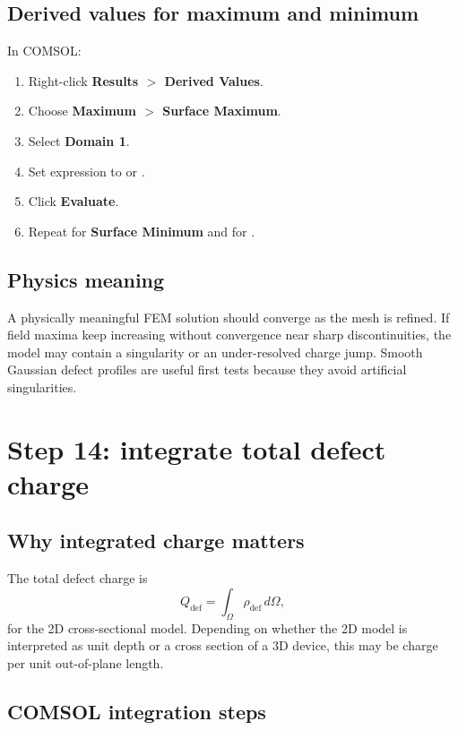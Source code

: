 \documentclass[11pt]{article}
\newcommand{\code}[1]{\texttt{\detokenize{#1}}}
\begin{document}
\subsection{Derived values for maximum and minimum}

In COMSOL:
\begin{enumerate}[leftmargin=2em]
\item Right-click \textbf{Results $>$ Derived Values}.
\item Choose \textbf{Maximum $>$ Surface Maximum}.
\item Select \textbf{Domain 1}.
\item Set expression to \code{es.V} or \code{V}.
\item Click \textbf{Evaluate}.
\item Repeat for \textbf{Surface Minimum} and for \code{es.normE}.
\end{enumerate}

\subsection{Physics meaning}

A physically meaningful FEM solution should converge as the mesh is refined. If field maxima keep increasing without convergence near sharp discontinuities, the model may contain a singularity or an under-resolved charge jump. Smooth Gaussian defect profiles are useful first tests because they avoid artificial singularities.

\section{Step 14: integrate total defect charge}

\subsection{Why integrated charge matters}

The total defect charge is
\begin{equation}
Q_{\mathrm{def}}=\int_{\Omega}\rho_{\mathrm{def}}\,d\Omega,
\end{equation}
for the 2D cross-sectional model. Depending on whether the 2D model is interpreted as unit depth or a cross section of a 3D device, this may be charge per unit out-of-plane length.

\subsection{COMSOL integration steps}
\end{document}
